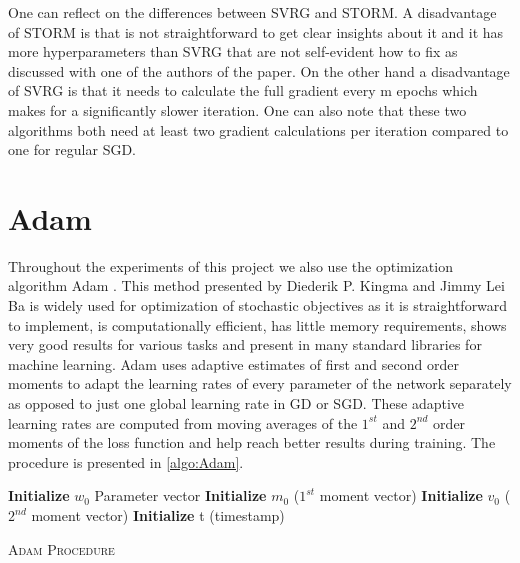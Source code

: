 \documentclass[a4paper,11pt,oneside]{report}
\begin{document}
One can reflect on the differences between SVRG and STORM. A disadvantage of STORM is that is not straightforward to get clear insights about it and it has more hyperparameters than SVRG that are not self-evident how to fix as discussed with one of the authors of the paper.  On the other hand a disadvantage of SVRG is that it needs to calculate the full gradient every m epochs which makes for a significantly slower iteration. One can also note that these two algorithms both need at least two gradient calculations per iteration compared to one for regular SGD.

\section{Adam}
Throughout the experiments of this project we also use the optimization algorithm Adam \citep{kingma2014adam}. This method presented by Diederik P. Kingma and Jimmy Lei Ba is widely used for optimization of stochastic objectives as it is straightforward to implement, is computationally efficient,
has little memory requirements, shows very good results for various tasks and present in many standard libraries for machine learning. Adam uses adaptive estimates of first and second order moments to adapt the learning rates of every parameter of the network separately as opposed to just one global learning rate in GD or SGD. These adaptive learning rates are computed from moving averages of the $1^{st}$ and $2^{nd}$ order moments of the loss function and help reach better results during training. The procedure is presented in \autoref{algo:Adam}. 
 
\begin{algorithm}[H]
    \DontPrintSemicolon
    \SetAlgoNoLine
    
    \KwIn{learning rate $\eta$, exponential decay rates for the moment estimates $\beta_1, \beta_2 \in [0,1)$}
    \textbf{Initialize} $w_0$ Parameter vector\;
    \textbf{Initialize} $m_0$ ($1^{st}$ moment vector)\;
    \textbf{Initialize} $v_0$ ($2^{nd}$ moment vector)\;
    \textbf{Initialize} t (timestamp)\;
    \caption{{\textsc{Adam Procedure}}}
    \label{algo:Adam}
\end{algorithm}
\end{document}

